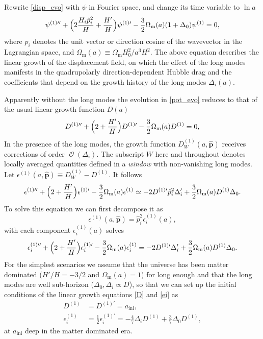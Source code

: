 \documentclass[a4paper,11pt]{article}
\DeclareMathOperator{\order}{\mathcal{O}}
\newcommand{\vp}{{\bm p}}
\begin{document}
Rewrite \eqref{disp_evo} with $\psi$ in Fourier space, and change its time
variable to $\ln a$
\begin{equation}
    \psi^{(1)\prime\prime} + \Bigl( 2 \frac{H_i \hat p_i^2} H + \frac{H'} H \Bigr) \psi^{(1)\prime}
    - \frac32 \Omega_\mathrm{m}(a) (1 + \Delta_0) \psi^{(1)} = 0,
    \label{pot_evo}
\end{equation}
where $\hat p_i$ denotes the unit vector or direction cosine of the wavevector
in the Lagrangian space, and $\Omega_\mathrm{m}(a) \equiv \Omega_\mathrm{m}
H_0^2 / a^3 H^2$.
The above equation describes the linear growth of the displacement field, on
which the effect of the long modes manifests in the quadrupolarly
direction-dependent Hubble drag and the coefficients that depend on the growth
history of the long modes $\Delta_i(a)$.

Apparently without the long modes the evolution in \eqref{pot_evo} reduces to
that of the usual linear growth function $D(a)$
\begin{equation}
    D^{(1)\prime\prime} + \Bigl( 2 + \frac{H'} H \Bigr) D^{(1)\prime}
    - \frac32 \Omega_\mathrm{m}(a) D^{(1)} = 0,
    \label{D}
\end{equation}
In the presence of the long modes, the growth function $D^{(1)}_W(a, \hat\vp)$
receives corrections of order $\order(\Delta_i)$.
The subscript $W$ here and throughout denotes locally averaged quantities
defined in a \emph{window} with non-vanishing long modes.
Let $\epsilon^{(1)}(a, \hat\vp) \equiv D^{(1)}_W - D^{(1)}$. It follows
\begin{equation}
    \epsilon^{(1)\prime\prime} + \Bigl( 2 + \frac{H'} H \Bigr) \epsilon^{(1)\prime}
    - \frac32 \Omega_\mathrm{m}(a) \epsilon^{(1)}
    \simeq
    - 2 D^{(1)\prime} \hat p_i^2 \Delta_i' + \frac32 \Omega_\mathrm{m}(a) D^{(1)} \Delta_0.
\end{equation}
To solve this equation we can first decompose it as
\begin{equation}
    \epsilon^{(1)}(a, \hat\vp) = \hat p_i^2 \epsilon^{(1)}_i(a),
    \label{e}
\end{equation}
with each component $\epsilon^{(1)}_i(a)$ solves
\begin{equation}
    \epsilon_i^{(1)\prime\prime} + \Bigl( 2 + \frac{H'} H \Bigr) \epsilon_i^{(1)\prime}
    - \frac32 \Omega_\mathrm{m}(a) \epsilon_i^{(1)}
    = - 2 D^{(1)\prime} \Delta_i' + \frac32 \Omega_\mathrm{m}(a) D^{(1)} \Delta_0.
    \label{ei}
\end{equation}
For the simplest scenarios we assume that the universe has been matter
dominated ($H'/H = -3/2$ and $\Omega_\mathrm{m}(a) = 1$) for long enough and
that the long modes are well sub-horizon ($\Delta_0, \Delta_i \propto D$), so
that we can set up the initial conditions of the linear growth equations
\eqref{D} and \eqref{ei} as
\begin{align}
    D^{(1)} &= D^{(1)\prime} = a_\mathrm{ini}, \nonumber\\
    \epsilon^{(1)}_i &= \frac12 \epsilon^{(1)\prime}_i
    = -\frac47 \Delta_i D^{(1)} + \frac37 \Delta_0 D^{(1)},
    \label{ICs}
\end{align}
at $a_\mathrm{ini}$ deep in the matter dominated era.
\end{document}
